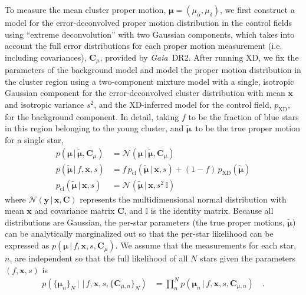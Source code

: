 \documentclass[twocolumn]{aastex62}
\newcommand{\acronym}[1]{{\small{#1}}}
\newcommand{\gaia}{\textsl{Gaia}}
\newcommand{\DR}[1]{\acronym{DR#1}}
\newcommand{\bs}[1]{\boldsymbol{#1}}
\newcommand{\given}{\,|\,}
\newcommand{\norm}{\mathcal{N}}
\newcommand{\mat}[1]{\mathbf{#1}}
\newcommand{\truepm}{\ensuremath{\tilde{\bs{\mu}}}}
\begin{document}
To measure the mean cluster proper motion, $\bs{\mu} = (\mu_\alpha, \mu_\delta)$, we first construct a model for the error-deconvolved proper motion distribution in the control fields using ``extreme deconvolution'' \citep[XD;][]{Bovy:2011} with two Gaussian components, which takes into account the full error distributions for each proper motion measurement (i.e. including covariances), $\mat{C}_\mu$, provided by \gaia\ \DR{2}.
After running XD, we fix the parameters of the background model and model the proper motion distribution in the cluster region using a two-component mixture model with a single, isotropic Gaussian component for the error-deconvolved cluster distribution with mean $\bs{x}$ and isotropic variance $s^2$, and the XD-inferred model for the control field, $p_{\textrm{XD}}$, for the background component.
In detail, taking $f$ to be the fraction of blue stars in this region belonging to the young cluster, and \truepm\ to be the true proper motion for a single star,
\begin{align}
    p(\bs{\mu} \given \truepm, \mat{C}_\mu) &=
        \norm(\bs{\mu} \given \truepm, \mat{C}_\mu)\\
    p(\truepm \given f, \bs{x}, s) &=
        f \, p_{\textrm{cl}}(\truepm \given \bs{x}, s)
        + (1-f) \, p_{\textrm{XD}}(\truepm)\\
    p_{\textrm{cl}}(\truepm \given \bs{x}, s) &=
        \norm(\truepm \given \bs{x}, s^2 \, \mathbb{I})
\end{align}
where $\norm(\bs{y} \given \bs{x}, \mat{C})$ represents the multidimensional normal distribution with mean $\bs{x}$ and covariance matrix $\mat{C}$, and $\mathbb{I}$ is the identity matrix.
Because all distributions are Gaussian, the per-star parameters (the true proper motions, \truepm) can be analytically marginalized out so that the per-star likelihood can be expressed as $p(\bs{\mu} \given f, \bs{x}, s, \mat{C}_\mu)$.
We assume that the measurements for each star, $n$, are independent so that the full likelihood of all $N$ stars given the parameters $(f, \bs{x}, s)$ is
\begin{align}
    p(\{\bs{\mu}_n\}_N \given \given f, \bs{x}, s, \{\mat{C}_{\mu, n}\}_N) &=
        \prod_n^N p(\bs{\mu}_n \given f, \bs{x}, s, \mat{C}_{\mu, n}) \quad .
        \label{eq:likelihood}
\end{align}
\end{document}
